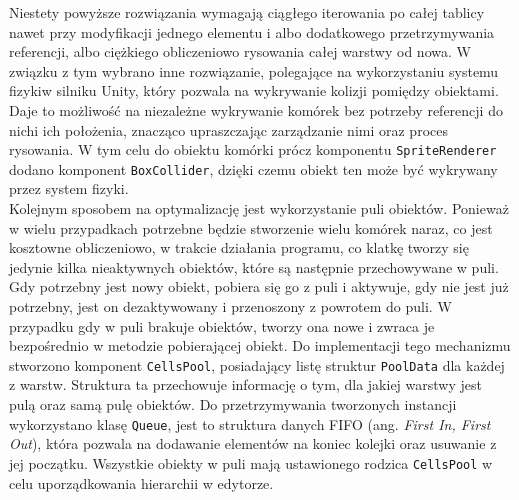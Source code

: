 Niestety powyższe rozwiązania wymagają ciągłego iterowania po całej tablicy nawet przy modyfikacji jednego elementu
i albo dodatkowego przetrzymywania referencji, albo ciężkiego obliczeniowo rysowania całej warstwy od nowa.
W związku z tym wybrano inne rozwiązanie, polegające na wykorzystaniu systemu fizyki\linebreak w silniku Unity,
który pozwala na wykrywanie kolizji pomiędzy obiektami.
Daje to możliwość na niezależne wykrywanie komórek bez potrzeby referencji do nich\linebreak i ich położenia,
znacząco upraszczając zarządzanie nimi oraz proces rysowania.\linebreak
W tym celu do obiektu komórki prócz komponentu \texttt{SpriteRenderer} dodano komponent \texttt{BoxCollider},
dzięki czemu obiekt ten może być wykrywany przez system fizyki.\\
\indent Kolejnym sposobem na optymalizację jest wykorzystanie puli obiektów.
Ponieważ w wielu przypadkach potrzebne będzie stworzenie wielu komórek naraz, co jest kosztowne obliczeniowo,
w trakcie działania programu, co klatkę tworzy się jedynie kilka nieaktywnych obiektów,
które są następnie przechowywane w puli.
Gdy potrzebny jest nowy obiekt, pobiera się go z puli i aktywuje, gdy nie jest już potrzebny,
jest on dezaktywowany i przenoszony z powrotem do puli.\linebreak
W przypadku gdy w puli brakuje obiektów, tworzy ona nowe i zwraca je bezpośrednio w metodzie pobierającej obiekt.
Do implementacji tego mechanizmu stworzono komponent \texttt{CellsPool},
posiadający listę struktur \texttt{PoolData} dla każdej z warstw.
Struktura ta przechowuje informację o tym, dla jakiej warstwy jest pulą oraz samą pulę obiektów.
Do przetrzymywania tworzonych instancji wykorzystano klasę \texttt{Queue},
jest to struktura danych FIFO (ang. \textit{First In, First Out}),
która pozwala na dodawanie elementów na koniec kolejki oraz usuwanie z jej początku.
Wszystkie obiekty w puli mają ustawionego rodzica \texttt{CellsPool} w celu uporządkowania hierarchii w edytorze.\\
